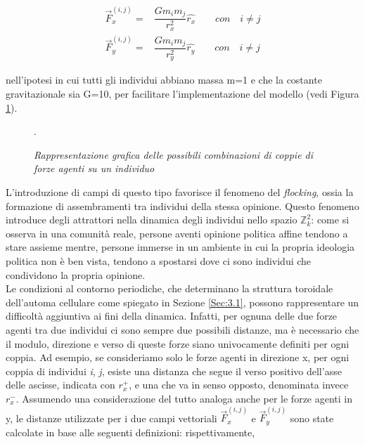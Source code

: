 \documentclass[letterpaper,10pt]{article}
\newcommand{\Zii}{$\mathbb{Z}^2_k$}
\begin{document}
\begin{equation}
\begin{aligned}
    \vec{F}_x^{(i,j)} =& \dfrac{Gm_im_j}{r_x^2} \hat{r_x} \quad\quad con \quad i\neq j\\
    \vec{F}_y^{(i,j)} =& \dfrac{Gm_im_j}{r_y^2} \hat{r_y} \quad\quad con \quad i\neq j
\end{aligned}
\label{Eq:5}
\end{equation}

nell'ipotesi in cui tutti gli individui abbiano massa m=1 e che la costante gravitazionale sia G=10, per facilitare l'implementazione del modello (vedi Figura \ref{Fig:7}). 

\begin{figure}[h]
\centering
{}
\caption{\textit{Rappresentazione grafica delle possibili combinazioni di coppie di forze agenti su un individuo}}.
\label{Fig:7}
\end{figure}

L'introduzione di campi di questo tipo favorisce il fenomeno del \textit{flocking}, ossia la formazione di assembramenti tra individui della stessa opinione. Questo fenomeno introduce degli attrattori nella dinamica degli individui nello spazio \Zii: come si osserva in una comunità reale, persone aventi opinione politica affine tendono a stare assieme mentre, persone immerse in un ambiente in cui la propria ideologia politica non è ben vista, tendono a spostarsi dove ci sono individui che condividono la propria opinione.
\\
Le condizioni al contorno periodiche, che determinano la struttura toroidale dell'automa cellulare come spiegato in Sezione \ref{Sec:3.1}, possono rappresentare un difficoltà aggiuntiva ai fini della dinamica. Infatti, per ognuna delle due forze agenti tra due individui ci sono sempre due possibili distanze, ma è necessario che il modulo, direzione e verso di queste forze siano univocamente definiti per ogni coppia. Ad esempio, se consideriamo solo le forze agenti in direzione x, per ogni coppia di individui \textit{i}, \textit{j}, esiste una distanza che segue il verso positivo dell'asse delle ascisse, indicata con $r_x^+$, e una che va in senso opposto, denominata invece $r_x^-$. Assumendo una considerazione del tutto analoga anche per le forze agenti in y, le distanze utilizzate per i due campi vettoriali $\vec{F}^{(i,j)}_x$ e $\vec{F}^{(i,j)}_y$ sono state calcolate in base alle seguenti definizioni: rispettivamente,
\end{document}
